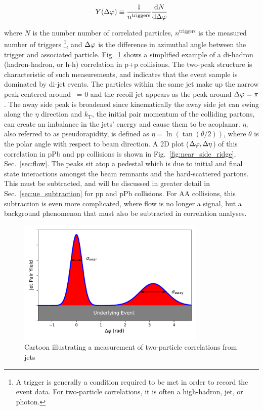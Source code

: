 \begin{equation}
    Y(\Delta\varphi)\equiv \frac{1}{n^\mathrm{triggers}}\frac{\mathrm{d}N}{\mathrm{d}\Delta\varphi}
    \label{eq:yield}
  \end{equation}

  where $N$ is the number number of correlated particles, $n^\mathrm{triggers}$ is the measured number of triggers \footnote{A trigger is generally a condition required to be met in order to record the event data. For two-particle correlations, it is often a high-\pt hadron, jet, or photon.}, and $\Delta\varphi$ is the difference in azimuthal angle between the trigger and associated particle. Fig.~\ref{fig:dihadron_cartoon} shows a simplified example of a di-hadron (hadron-hadron, or h-h) correlation in p+p collisions. The two-peak structure is characteristic of such measurements, and indicates that the event sample is dominated by di-jet events. The particles within the same jet make up the narrow peak centered around \deltaphi~= 0 and the recoil jet appears as the peak around $\Delta\varphi = \pi$. The away side peak is broadened since kinematically the away side jet can swing along the $\eta$ direction and $k_\mathrm{T}$, the initial pair momentum of the colliding partons, can create an imbalance in the jets’ energy and cause them to be acoplanar. $\eta$, also referred to as pseudorapidity, is defined as $\eta = \ln(\tan(\theta/2))$, where $\theta$ is the polar angle with respect to beam direction. A 2D plot ($\Delta\varphi,\Delta\eta$) of this correlation in pPb and pp collisions is shown in Fig.~\ref{fig:near_side_ridge}, Sec.~\ref{sec:flow}. The peaks sit atop a pedestal which is due to initial and final state interactions amongst the beam remnants and the hard-scattered partons. This must be subtracted, and will be discussed in greater detail in Sec.~\ref{sec:ue_subtraction} for pp and pPb collisions. For AA collisions, this subtraction is even more complicated, where flow is no longer a signal, but a background phenomenon that must also be subtracted in correlation analyses. 

  \begin{figure}[htpb]
    \centering
    \includegraphics[width=0.8\textwidth]{Introduction/dihadron_cartoon.pdf}
    \caption{Cartoon illustrating a measurement of two-particle correlations from jets}
    \label{fig:dihadron_cartoon}
  \end{figure}

